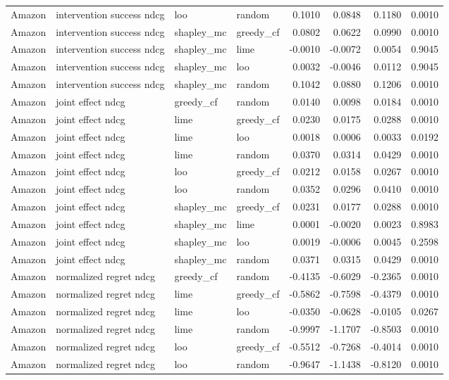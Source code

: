 \begin{longtable}{@{}p{}p{}p{}p{}rrrr@{}}
Amazon & intervention success ndcg & loo & random & 0.1010 & 0.0848 & 0.1180 & 0.0010 \\
Amazon & intervention success ndcg & shapley\_mc & greedy\_cf & 0.0802 & 0.0622 & 0.0990 & 0.0010 \\
Amazon & intervention success ndcg & shapley\_mc & lime & -0.0010 & -0.0072 & 0.0054 & 0.9045 \\
Amazon & intervention success ndcg & shapley\_mc & loo & 0.0032 & -0.0046 & 0.0112 & 0.9045 \\
Amazon & intervention success ndcg & shapley\_mc & random & 0.1042 & 0.0880 & 0.1206 & 0.0010 \\
Amazon & joint effect ndcg & greedy\_cf & random & 0.0140 & 0.0098 & 0.0184 & 0.0010 \\
Amazon & joint effect ndcg & lime & greedy\_cf & 0.0230 & 0.0175 & 0.0288 & 0.0010 \\
Amazon & joint effect ndcg & lime & loo & 0.0018 & 0.0006 & 0.0033 & 0.0192 \\
Amazon & joint effect ndcg & lime & random & 0.0370 & 0.0314 & 0.0429 & 0.0010 \\
Amazon & joint effect ndcg & loo & greedy\_cf & 0.0212 & 0.0158 & 0.0267 & 0.0010 \\
Amazon & joint effect ndcg & loo & random & 0.0352 & 0.0296 & 0.0410 & 0.0010 \\
Amazon & joint effect ndcg & shapley\_mc & greedy\_cf & 0.0231 & 0.0177 & 0.0288 & 0.0010 \\
Amazon & joint effect ndcg & shapley\_mc & lime & 0.0001 & -0.0020 & 0.0023 & 0.8983 \\
Amazon & joint effect ndcg & shapley\_mc & loo & 0.0019 & -0.0006 & 0.0045 & 0.2598 \\
Amazon & joint effect ndcg & shapley\_mc & random & 0.0371 & 0.0315 & 0.0429 & 0.0010 \\
Amazon & normalized regret ndcg & greedy\_cf & random & -0.4135 & -0.6029 & -0.2365 & 0.0010 \\
Amazon & normalized regret ndcg & lime & greedy\_cf & -0.5862 & -0.7598 & -0.4379 & 0.0010 \\
Amazon & normalized regret ndcg & lime & loo & -0.0350 & -0.0628 & -0.0105 & 0.0267 \\
Amazon & normalized regret ndcg & lime & random & -0.9997 & -1.1707 & -0.8503 & 0.0010 \\
Amazon & normalized regret ndcg & loo & greedy\_cf & -0.5512 & -0.7268 & -0.4014 & 0.0010 \\
Amazon & normalized regret ndcg & loo & random & -0.9647 & -1.1438 & -0.8120 & 0.0010 \\

\end{longtable}
